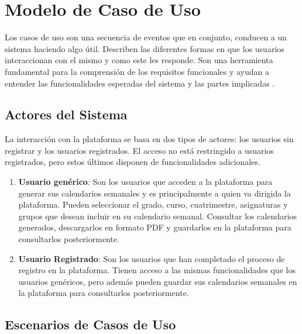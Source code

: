 \section{Modelo de Caso de Uso}

Los casos de uso son una secuencia de eventos que en conjunto, conducen a un sistema haciendo algo útil. Describen las diferentes formas en que los usuarios interaccionan con el mismo y como este les responde. Son una herramienta fundamental para la comprensión de los requisitos funcionales y ayudan a entender las funcionalidades esperadas del sistema y las partes implicadas \cite{bittner2003use}.

\subsection{Actores del Sistema}

La interacción con la plataforma se basa en dos tipos de actores: los usuarios sin registrar y los usuarios registrados. El acceso no está restringido a usuarios registrados, pero estos últimos disponen de funcionalidades adicionales.

\begin{enumerate}
    \item \textbf{Usuario genérico}: Son los usuarios que acceden a la plataforma para generar sus calendarios semanales y es principalmente a quien va dirigida la plataforma. Pueden seleccionar el grado, curso, cuatrimestre, asignaturas y grupos que desean incluir en su calendario semanal. Consultar los calendarios generados, descargarlos en formato PDF y guardarlos en la plataforma para consultarlos posteriormente.
    \item \textbf{Usuario Registrado}: Son los usuarios que han completado el proceso de registro en la plataforma. Tienen acceso a las mismas funcionalidades que los usuarios genéricos, pero además pueden guardar sus calendarios semanales en la plataforma para consultarlos posteriormente.
\end{enumerate}

\subsection{Escenarios de Casos de Uso}

\setcounter{ccCounter}{1}

